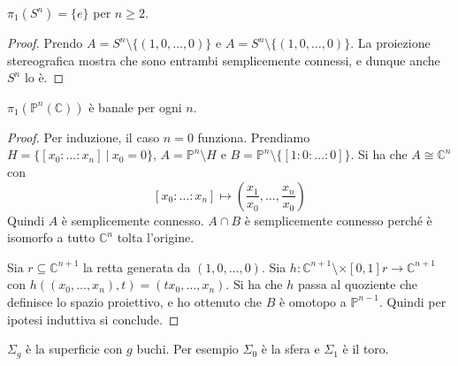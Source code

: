 \begin{ex}
    $\pi_1(S^n)=\{e\}$ per $n\geq 2$.
\end{ex}
\begin{proof}
    Prendo $A=S^n\setminus\{(1,0,\dots,0)\}$ e $A=S^n\setminus\{(1,0,\dots,0)\}$. La proiezione stereografica mostra che sono entrambi semplicemente connessi, e dunque anche $S^n$ lo \`e.
\end{proof}

\begin{ex}
    $\pi_1(\mathbb{P}^n(\mathbb{C}))$ \`e banale per ogni $n$.
\end{ex}
\begin{proof}
    Per induzione, il caso $n=0$ funziona. Prendiamo $H = \{[x_0:\dots:x_n]\ | \ x_0=0\}$, $A = \mathbb{P}^n\setminus H$ e $B= \mathbb{P}^n\setminus \{[1:0:\dots:0]\}$. Si ha che $A\cong \mathbb{C}^n$ con
    \[
        [x_0:\dots:x_n]\mapsto(\frac{x_1}{x_0},\dots, \frac{x_n}{x_0})
    \]
    Quindi $A$ \`e semplicemente connesso.
    $A\cap B$ \`e semplicemente connesso perch\'e \`e isomorfo a tutto $\mathbb{C}^n$ tolta l'origine.

    Sia $r\subseteq\mathbb{C}^{n+1}$ la retta generata da $(1,0,\dots, 0)$.
    Sia $h\colon\mathbb{C}^{n+1}\setminus \times [0,1] r\longrightarrow \mathbb{C}^{n+1}$ con $h((x_0, \dots, x_n), t)=(tx_0, \dots, x_n)$.
    Si ha che $h$ passa al quoziente che definisce lo spazio proiettivo, e ho ottenuto che $B$ \`e omotopo a $\mathbb{P}^{n-1}$. Quindi per ipotesi induttiva si conclude.
\end{proof}

\begin{defn}
    $\Sigma_g$ \`e la superficie con $g$ buchi. Per esempio $\Sigma_0$ \`e la sfera e $\Sigma_1$ \`e il toro.
\end{defn}

